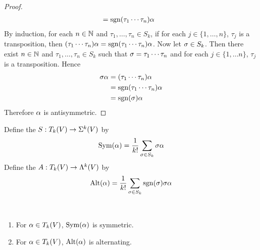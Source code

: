 \documentclass{book}
\begin{document}
\begin{proof}
\begin{align*}
			& = \operatorname{sgn}(\tau_1 \cdots \tau_n) \alpha 
		\end{align*}
		By induction, for each $n \in \mathbb{N}$ and $\tau_1, \ldots, \tau_n \in S_k$, if for each $j \in \{1, \ldots, n\}$, $\tau_j$ is a transposition, then $(\tau_1 \cdots \tau_n) \alpha  = \operatorname{sgn}(\tau_1 \cdots \tau_n) \alpha$. Now let $\sigma \in S_k$. Then there exist $n \in \mathbb{N}$ and $\tau_1, \ldots, \tau_n \in S_k$ such that $\sigma = \tau_1 \cdots \tau_n$ and for each $j \in \{1, \ldots n\}$, $\tau_j$ is a transposition. Hence
		\begin{align*}
			\sigma \alpha 
			& = (\tau_1 \cdots \tau_n) \alpha \\
			& =  \operatorname{sgn}(\tau_1 \cdots \tau_n) \alpha \\
			& = \operatorname{sgn}(\sigma) \alpha
		\end{align*}
		Therefore $\alpha$ is antisymmetric.
	\end{proof}
	
	\begin{defn}
		Define the  $S: T_k(V) \rightarrow \Sigma^k(V)$ by $$\operatorname{Sym}(\alpha) = \frac{1}{k!}\sum_{\sigma \in S_k} \sigma \alpha$$  Define the  $A: T_k(V) \rightarrow \Lambda^k(V)$ by $$\operatorname{Alt}(\alpha) = \frac{1}{k!}\sum_{\sigma \in S_k} \operatorname{sgn}(\sigma)\sigma \alpha$$
	\end{defn}
	
	\begin{ex}\
		\begin{enumerate}
			\item For $\alpha \in T_k(V)$, $\operatorname{Sym}(\alpha)$ is symmetric.
			\item For $\alpha \in T_k(V)$, $\operatorname{Alt}(\alpha)$ is alternating.
		\end{enumerate}
	\end{ex}
\end{document}
